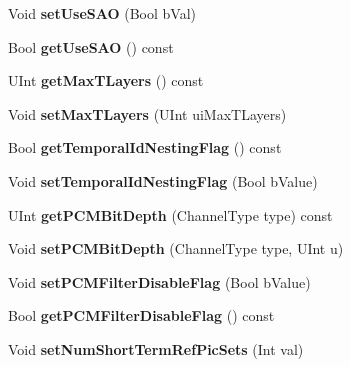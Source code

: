 \begin{DoxyCompactItemize}
Void {\bfseries set\+Use\+S\+AO} (Bool b\+Val)
\item 
\mbox{\label{class_t_com_s_p_s_a8d4a2602cf9fa9bfaf87f011c1ccf3b5}} 
Bool {\bfseries get\+Use\+S\+AO} () const
\item 
\mbox{\label{class_t_com_s_p_s_afeb5aff7b9604a20bbc86f0c01d27fa3}} 
U\+Int {\bfseries get\+Max\+T\+Layers} () const
\item 
\mbox{\label{class_t_com_s_p_s_a345dc71794d5f851b8c4da6bab1c164e}} 
Void {\bfseries set\+Max\+T\+Layers} (U\+Int ui\+Max\+T\+Layers)
\item 
\mbox{\label{class_t_com_s_p_s_a41c28d19c7dc2d75442393f933f97284}} 
Bool {\bfseries get\+Temporal\+Id\+Nesting\+Flag} () const
\item 
\mbox{\label{class_t_com_s_p_s_a5fbb0e8ef3a4b726f17048260e0ac558}} 
Void {\bfseries set\+Temporal\+Id\+Nesting\+Flag} (Bool b\+Value)
\item 
\mbox{\label{class_t_com_s_p_s_a2cbfc25cbc3c56a85595f21a2cd128c9}} 
U\+Int {\bfseries get\+P\+C\+M\+Bit\+Depth} (Channel\+Type type) const
\item 
\mbox{\label{class_t_com_s_p_s_a4d4a5c2debb0d396c1909b072f3c36b6}} 
Void {\bfseries set\+P\+C\+M\+Bit\+Depth} (Channel\+Type type, U\+Int u)
\item 
\mbox{\label{class_t_com_s_p_s_a6404a3767fa2c7e5da2d81dd7dd3bdc7}} 
Void {\bfseries set\+P\+C\+M\+Filter\+Disable\+Flag} (Bool b\+Value)
\item 
\mbox{\label{class_t_com_s_p_s_ab0e047d927a0406fc07f31c1b53501ba}} 
Bool {\bfseries get\+P\+C\+M\+Filter\+Disable\+Flag} () const
\item 
\mbox{\label{class_t_com_s_p_s_a3f848d19a31e7bfd46e17d07bfe8c041}} 
Void {\bfseries set\+Num\+Short\+Term\+Ref\+Pic\+Sets} (Int val)
\item 
\mbox{\label{class_t_com_s_p_s_a1e57d054673dbd647070310bac558d75}} 

\end{DoxyCompactItemize}
